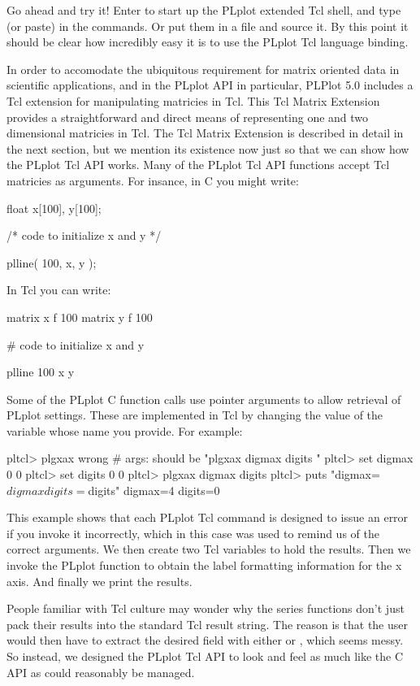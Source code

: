 Go ahead and try it!  Enter  to start up the PLplot
extended Tcl shell, and type (or paste) in the commands.  Or put them
in a file and source it.  By this point it should be clear how
incredibly easy it is to use the PLplot Tcl language binding.

In order to accomodate the ubiquitous requirement for matrix oriented
data in scientific applications, and in the PLplot API in particular,
PLPlot 5.0 includes a Tcl extension for manipulating matricies in Tcl.
This Tcl Matrix Extension provides a straightforward and direct means
of representing one and two dimensional matricies in Tcl.  The Tcl
Matrix Extension is described in detail in the next section, but we
mention its existence now just so that we can show how the PLplot Tcl
API works.  Many of the PLplot Tcl API functions accept Tcl matricies
as arguments.  For insance, in C you might write:
\begin{example}
float x[100], y[100];

/* code to initialize x and y */

plline( 100, x, y );
\end{example}
In Tcl you can write:
\begin{example}
matrix x f 100
matrix y f 100

# code to initialize x and y

plline 100 x y
\end{example}

Some of the PLplot C function calls use pointer arguments to allow
retrieval of PLplot settings.  These are implemented in Tcl by
changing the value of the variable whose name you provide.  For
example:
\begin{example}
pltcl> plgxax
wrong # args: should be "plgxax digmax digits  "
pltcl> set digmax 0
0
pltcl> set digits 0
0
pltcl> plgxax digmax digits
pltcl> puts "digmax=$digmax digits=$digits"
digmax=4 digits=0
\end{example}
This example shows that each PLplot Tcl command is designed to issue
an error if you invoke it incorrectly, which in this case was used to
remind us of the correct arguments.  We then create two Tcl variables
to hold the results.  Then we invoke the PLplot  function
to obtain the label formatting information for the x axis.  And
finally we print the results.

People familiar with Tcl culture may wonder why the  series
functions don't just pack their results into the standard Tcl result
string.  The reason is that the user would then have to extract the
desired field with either  or , which seems
messy.  So instead, we designed the PLplot Tcl API to look and feel as
much like the C API as could reasonably be managed.

